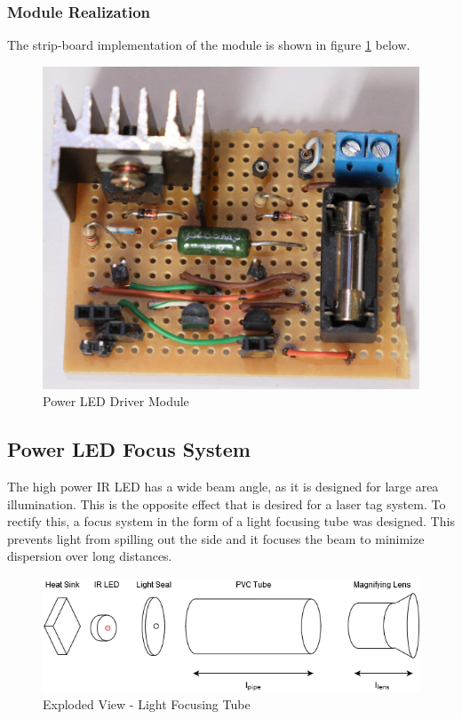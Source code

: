 

\subsubsection{Module Realization}
The strip-board implementation of the module is shown in figure \ref{fig:module_power_led_driver} below.

\begin{figure}[H]
	\centering
	\includegraphics[width=.6\textwidth]{figures/modules/power_led_driver.jpg}
	\caption{Power LED Driver Module}
	\label{fig:module_power_led_driver}
\end{figure}






\subsection{Power LED Focus System}

The high power IR LED has a wide beam angle, as it is designed for large area illumination. This is the opposite effect that is desired for a laser tag system. To rectify this, a focus system in the form of a light focusing tube was designed. This prevents light from spilling out the side and it focuses the beam to minimize dispersion over long distances.

\begin{figure}[H]
	\centering
	\includegraphics[width=.8\textwidth]{figures/design/beam_tube.png}
	\caption{Exploded View - Light Focusing Tube}
	\label{fig:light_focusing_tube}
\end{figure}

